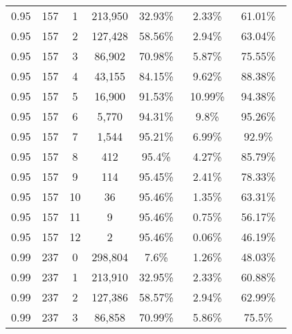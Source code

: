 \begin{figure}[!htbp]
{\begin{tabular}{ |c|c|c|c|c|c|c| }
        0.95             &157             &1            &213,950                 & 32.93\%\     & 2.33\%\               & 61.01\%\ \\
        0.95             &157             &2            &127,428                 & 58.56\%\     & 2.94\%\               & 63.04\%\ \\
        0.95             &157             &3            &86,902                 & 70.98\%\     & 5.87\%\               & 75.55\%\ \\
        0.95             &157             &4            &43,155                 & 84.15\%\     & 9.62\%\               & 88.38\%\ \\
        0.95             &157             &5            &16,900                 & 91.53\%\     & 10.99\%\               & 94.38\%\ \\
        0.95             &157             &6            &5,770                 & 94.31\%\     & 9.8\%\               & 95.26\%\ \\
        0.95             &157             &7            &1,544                 & 95.21\%\     & 6.99\%\               & 92.9\%\ \\
        0.95             &157             &8            &412                 & 95.4\%\     & 4.27\%\               & 85.79\%\ \\
        0.95             &157             &9            &114                 & 95.45\%\     & 2.41\%\               & 78.33\%\ \\
        0.95             &157             &10            &36                 & 95.46\%\     & 1.35\%\               & 63.31\%\ \\
        0.95             &157             &11            &9                 & 95.46\%\     & 0.75\%\               & 56.17\%\ \\
        0.95             &157             &12            &2                 & 95.46\%\     & 0.06\%\               & 46.19\%\ \\
        \hline
        0.99             &237             &0            &298,804                 & 7.6\%\     & 1.26\%\               & 48.03\%\ \\
        0.99             &237             &1            &213,910                 & 32.95\%\     & 2.33\%\               & 60.88\%\ \\
        0.99             &237             &2            &127,386                 & 58.57\%\     & 2.94\%\               & 62.99\%\ \\
        0.99             &237             &3            &86,858                 & 70.99\%\     & 5.86\%\               & 75.5\%\ \\

\end{tabular}}
\end{figure}
